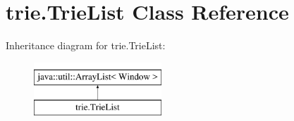 \hypertarget{classtrie_1_1_trie_list}{}\section{trie.\+Trie\+List Class Reference}
\label{classtrie_1_1_trie_list}
Inheritance diagram for trie.\+Trie\+List\+:\begin{figure}[H]
\begin{center}
\leavevmode
\includegraphics[height=2.000000cm]{classtrie_1_1_trie_list}
\end{center}
\end{figure}
